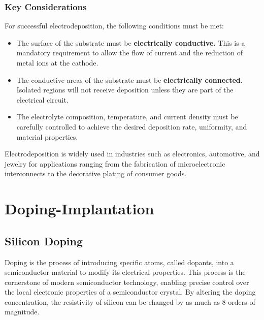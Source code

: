 \documentclass{report}
\begin{document}
\subsection{Key Considerations}
For successful electrodeposition, the following conditions must be met:
\begin{itemize}
    \item The surface of the substrate must be \textbf{electrically conductive.} This is a mandatory requirement to allow the flow of current and the reduction of metal ions at the cathode.
    \item The conductive areas of the substrate must be \textbf{electrically connected.} Isolated regions will not receive deposition unless they are part of the electrical circuit.
    \item The electrolyte composition, temperature, and current density must be carefully controlled to achieve the desired deposition rate, uniformity, and material properties.
\end{itemize}

Electrodeposition is widely used in industries such as electronics, automotive, and jewelry for applications ranging from the fabrication of microelectronic interconnects to the decorative plating of consumer goods.

\clearpage
\chapter{Doping-Implantation}
\section{Silicon Doping}
Doping is the process of introducing specific atoms, called dopants, into a semiconductor material to modify its electrical properties. This process is the cornerstone of modern semiconductor technology, enabling precise control over the local electronic properties of a semiconductor crystal. By altering the doping concentration, the resistivity of silicon can be changed by as much as 8 orders of magnitude.
\end{document}

